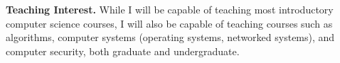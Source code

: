 \documentclass{NSF}
\newcommand{\BfPara}[1]{{\noindent\textbf{#1.}}\xspace}
\begin{document}

\BfPara{Teaching Interest} While I will be capable of teaching most introductory computer science courses, I will also be capable of teaching courses such as algorithms, computer systems (operating systems, networked systems), and computer security, both graduate and undergraduate. 
\end{document}
